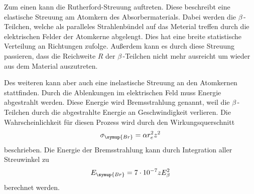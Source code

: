 Zum einen kann die Rutherford-Streuung auftreten. Diese beschreibt eine elastische Streuung am Atomkern des Absorbermaterials. Dabei werden die $\beta$\,-Teilchen, welche 
als paralleles Strahlenbündel auf das Meterial treffen durch die elektrischen Felder der Atomkerne abgelengt. Dies hat eine breite statistische Verteilung an Richtungen 
zufolge. Außerdem kann es durch diese Streuung passieren, dass die Reichweite $R$ der $\beta$\,-Teilchen nicht mehr ausreicht um wieder aus dem Material auszutreten. 


Des weiteren kann aber auch eine inelastische Streuung an den Atomkernen stattfinden. Durch die Ablenkungen im elektrischen Feld muss Energie abgestrahlt werden. Diese 
Energie wird Bremsstrahlung genannt, weil die $\beta$\,-Teilchen durch die abgestrahlte Energie an Geschwindigkeit verlieren. Die Wahrscheinlichkeit für diesen Prozess
wird durch den Wirkungsquerschnitt
\begin{equation}
    \sigma_{\symup{Br}} = \alpha r_e^2 z^2
\end{equation}
beschrieben. Die Energie der Bremsstrahlung kann durch Integration aller Streuwinkel zu 
\begin{equation}
    E_{\symup{Br}} = 7\cdot 10^{-7} z E_\beta^2
\end{equation}
berechnet werden.